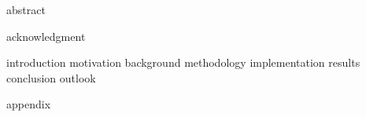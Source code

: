 \documentclass[paper=a4,twoside=true,fontsize=11pt,numbers=noendperiod,chapterprefix=false]{scrbook}
\begin{document}
{abstract}

\cleardoublepage

\cleardoublepage

{acknowledgment}

\tableofcontents
\cleardoublepage

\listoffigures
{}
\cleardoublepage

\listoftables
{}
\cleardoublepage

\renewcommand*{\chapterpagestyle}{mychapterpagestyle}
\renewcommand*{\chapterformat}{} %

{introduction}
{motivation}
{background}
{methodology}
{implementation}
{results}
{conclusion}
{outlook}


\appendix
\clearpage
\renewcommand*{\chapterpagestyle}{myappendixpagestyle}
{appendix}

\clearpage
\renewcommand*{\chapterpagestyle}{empty}
\nocite{*}
% 

\end{document}
